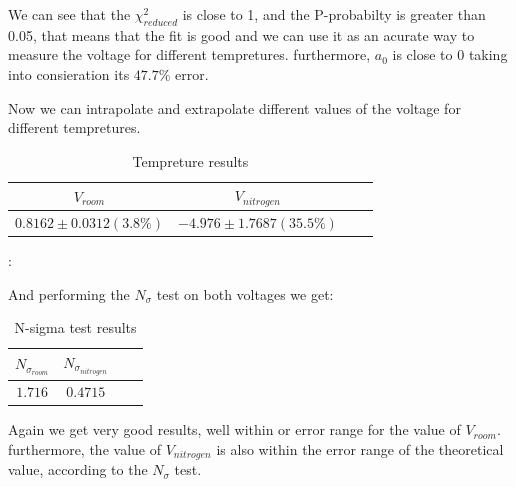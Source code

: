 \documentclass[12pt,a4paper]{report}
\begin{document}
  \begin{table}[htbp]
    \centering
    \label{tab:partB_summary}
    \caption{Part B results}
  \end{table}
  We can see that the $\chi _{reduced}^2$ is close to 1, and the P-probabilty is greater than 0.05, that means that the fit is good and we can use it as an acurate way to measure the voltage for different tempretures. furthermore, $a_0$ is close to 0 taking into consieration its $47.7 \%$ error. 

  \pagebreak
  Now we can intrapolate and extrapolate different values of the voltage for different tempretures.
  \begin{table}[htbp]
    \centering
    \label{Part B tempreture results}
    \begin{tabular}{@{}cccc@{}}
      \toprule
       $V_{room}$ & $V_{nitrogen}$ \\
      \midrule
      $0.8162 \pm 0.0312 (3.8 \%)$ & $-4.976 \pm 1.7687 (35.5 \%)$ \\
      \bottomrule
    \end{tabular}
    \caption{Tempreture results}
\end{table}:

And performing the $N_\sigma$ test on both voltages we get:

\begin{table}[htbp]
    \centering
    \label{Part B N-sigma test results}
    \begin{tabular}{@{}cccc@{}}
      \toprule
       $N_{\sigma_{room}} $& $N_{\sigma_{nitrogen}}$ \\
      \midrule
      $1.716$ & $0.4715$ \\
      \bottomrule
    \end{tabular}
    \caption{N-sigma test results}

\end{table}
Again we get very good results, well within or error range for the value of $V_{room}$. furthermore, the value of $V_{nitrogen}$ is also within the error range of the theoretical value, according to the $N_\sigma$ test.
\end{document}
